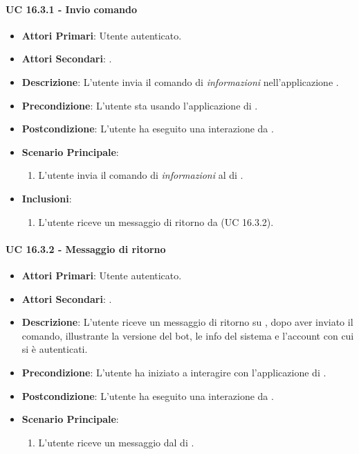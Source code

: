 		\paragraph{UC 16.3.1 - Invio comando}
		\begin{itemize}
			\item \textbf{Attori Primari}: Utente autenticato.
			\item \textbf{Attori Secondari}: .
			\item \textbf{Descrizione}: L'utente invia il comando di \textit{informazioni} nell'applicazione .
			\item \textbf{Precondizione}: L'utente sta usando l'applicazione di .
			\item \textbf{Postcondizione}: L'utente ha eseguito una interazione da .
			\item \textbf{Scenario Principale}:
			\begin{enumerate}
				\item L'utente invia il comando di \textit{informazioni} al  di .
			\end{enumerate}
			\item \textbf{Inclusioni}:
			\begin{enumerate}
				\item L'utente riceve un messaggio di ritorno da  (UC 16.3.2).
			\end{enumerate}
		\end{itemize}

		\paragraph{UC 16.3.2 - Messaggio di ritorno}
		\begin{itemize}
			\item \textbf{Attori Primari}: Utente autenticato.
			\item \textbf{Attori Secondari}: .
			\item \textbf{Descrizione}: L'utente riceve un messaggio di ritorno su , dopo aver inviato il comando, illustrante la versione del bot, le info del sistema e l'account con cui si è autenticati.
			\item \textbf{Precondizione}: L'utente ha iniziato a interagire con l'applicazione di .
			\item \textbf{Postcondizione}: L'utente ha eseguito una interazione da .
			\item \textbf{Scenario Principale}:
			\begin{enumerate}
				\item L'utente riceve un messaggio dal  di .
			\end{enumerate}
		\end{itemize}		


